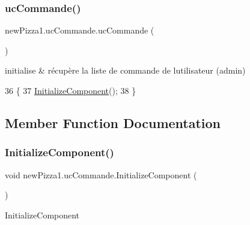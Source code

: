 \subsubsection{\texorpdfstring{uc\+Commande()}{ucCommande()}}
{\footnotesize\ttfamily new\+Pizza1.\+uc\+Commande.\+uc\+Commande (\begin{DoxyParamCaption}{ }\end{DoxyParamCaption})\hspace{0.3cm}{\ttfamily [inline]}}



initialise \& récupère la liste de commande de l\textquotesingle{}utilisateur (admin) 


\begin{DoxyCode}
36         \{
37             \hyperlink{classnewPizza1_1_1ucCommande_a3f6251cc87dd9f2a2db45c5413ce1711}{InitializeComponent}();
38         \}
\end{DoxyCode}


\subsection{Member Function Documentation}
\mbox{\label{classnewPizza1_1_1ucCommande_a3f6251cc87dd9f2a2db45c5413ce1711}} 
\subsubsection{\texorpdfstring{Initialize\+Component()}{InitializeComponent()}\hspace{0.1cm}{\footnotesize\ttfamily [1/6]}}
{\footnotesize\ttfamily void new\+Pizza1.\+uc\+Commande.\+Initialize\+Component (\begin{DoxyParamCaption}{ }\end{DoxyParamCaption})\hspace{0.3cm}{\ttfamily [inline]}}



Initialize\+Component 


